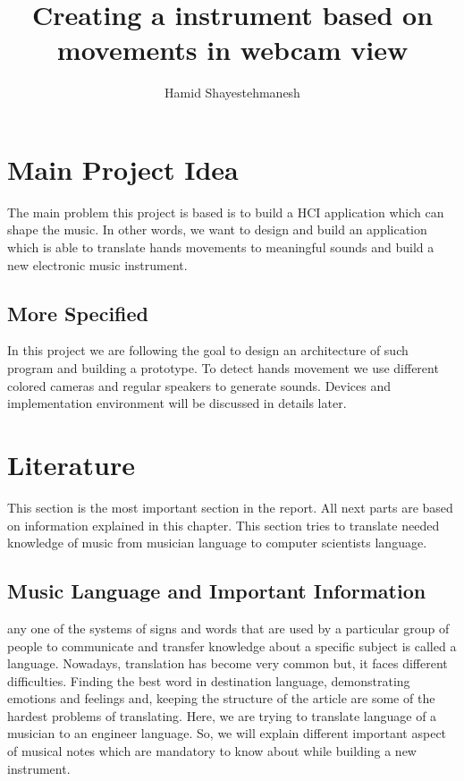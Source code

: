 \documentclass{report}
\begin{document}
\author{Hamid Shayestehmanesh}
\title{Creating a instrument based on movements in webcam view}
\maketitle
\tableofcontents
\newpage

\section{Main Project Idea}

The main problem this project is based is to build a HCI application which can shape the music. In other words, we want to design and build an application which is able to translate hands movements to meaningful sounds and build a new electronic music instrument.
\subsection{More Specified}
In this project we are following the goal to design an architecture of such program and building a prototype. To detect hands movement we use different colored cameras and regular speakers to generate sounds. Devices and implementation environment will be discussed in details later.
\pagebreak


\section{Literature}
This section is the most important section in the report. All next parts are based on information explained in this chapter. This section tries to translate needed knowledge of music from musician language to computer scientists language. 
\subsection{Music Language and Important Information}
any one of the systems of signs and words that are used by a particular group of people to communicate and transfer knowledge about a specific subject is called a language\citep{Lang}. Nowadays, translation has become very common but, it faces different difficulties. Finding the best word in destination language, demonstrating emotions and feelings and, keeping the structure of the article are some of the hardest problems of translating. Here, we are trying to translate language of a musician to an engineer language. So, we will explain different important aspect of musical notes which are mandatory to know about while building a new instrument.  
\end{document}
